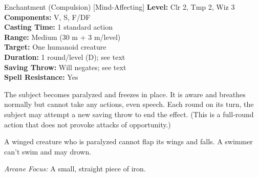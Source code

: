 {Enchantment (Compulsion) [Mind-Affecting]}
{
	\textbf{Level:}
	Clr 2, Tmp 2, Wiz 3\\
	\textbf{Components:}
	V, S, F/DF\\
	\textbf{Casting Time:}
	1 standard action\\
	\textbf{Range:}
	Medium (30 m + 3 m/level)\\
	\textbf{Target:}
	One humanoid creature\\
	\textbf{Duration:}
	1 round/level (D); see text\\
	\textbf{Saving Throw:}
	Will negates; see text\\
	\textbf{Spell Resistance:}
	Yes\\
}
{
	The subject becomes paralyzed and freezes in place. It is aware and breathes normally but cannot take any actions, even speech. Each round on its turn, the subject may attempt a new saving throw to end the effect. (This is a full-round action that does not provoke attacks of opportunity.)

	A winged creature who is paralyzed cannot flap its wings and falls. A swimmer can't swim and may drown.

	\textit{Arcane Focus:}
	A small, straight piece of iron.

}
